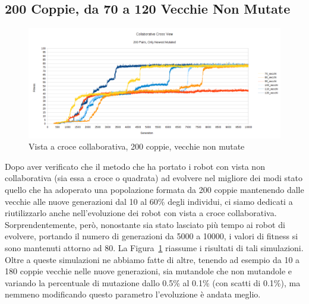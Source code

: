 \subsection{200 Coppie, da 70 a 120 Vecchie Non Mutate}
\begin{figure}[ht]
	\centering
	\includegraphics[scale=0.7,angle=90]{imgs/cross_c_200_pairs_70_120_old_not_mutated.png}
	\caption{Vista a croce collaborativa, 200 coppie, vecchie non mutate}
	\label{figure:cross_c_200_70_120_non}
\end{figure}
Dopo aver verificato che il metodo che ha portato i robot con vista non
collaborativa (sia essa a croce o quadrata) ad evolvere nel migliore dei modi 
stato quello che ha adoperato una popolazione formata da 200 coppie mantenendo
dalle vecchie alle nuove generazioni dal 10 al 60\% degli individui, ci siamo
dedicati a riutilizzarlo anche nell'evoluzione dei robot con vista a croce
collaborativa.\newline
Sorprendentemente, però, nonostante sia stato lasciato più tempo ai robot di
evolvere, portando il numero di generazioni da 5000 a 10000, i valori di fitness
si sono mantenuti attorno ad 80. La Figura~\ref{figure:cross_c_200_70_120_non}
riassume i risultati di tali simulazioni.\newline
Oltre a queste simulazioni ne abbiamo fatte di altre, tenendo ad esempio da 10
a 180 coppie vecchie nelle nuove generazioni, sia mutandole che non mutandole e
variando la percentuale di mutazione dallo 0.5\% al 0.1\% (con scatti di 0.1\%),
ma nemmeno modificando questo parametro l'evoluzione è andata meglio.



\clearpage



